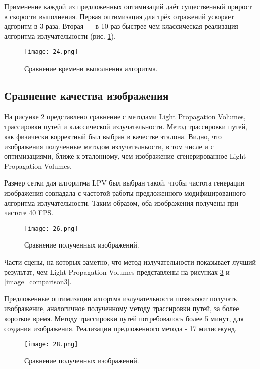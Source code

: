 \documentclass[12pt,fleqn]{article}
\begin{document}
Применение каждой из предложенных оптимизаций даёт существенный прирост в скорости выполнения. Первая оптимизация для трёх отражений ускоряет адгоритм в 3 раза. Вторая --- в 10 раз быстрее чем классическая реализация алгоритма излучательности (рис. \ref{speed_comparison}).

\begin{figure}[htb]
    \centering
    \texttt{[image: 24.png]}
    \caption{Сравнение времени выполнения алгоритма.}
    \label{speed_comparison}
\end{figure}


\subsection{Сравнение качества изображения}

На рисунке \ref{image_comparison} представлено сравнение с методами Light Propagation Volumes, трассировки путей и классической излучательности. Метод трассировки путей, как физически корректный был выбран в качестве эталона. Видно, что изображения полученные матодом излучателньости, в том числе и с оптимизациями, ближе к эталонному, чем изображение сгенерированное Light Propagation Volumes. 

Размер сетки для алгоритма LPV был выбран такой, чтобы частота генерации изображения совпадала с частотой работы предложенного модифицированного алгоритма излучательности. Таким образом, оба изображения получены при частоте 40 FPS.

\pagebreak

\begin{figure}[htb]
    \centering
    \texttt{[image: 26.png]}
    \caption{Сравнение полученных изображений.}
    \label{image_comparison}
\end{figure}

Части сцены, на которых заметно, что метод излучательности показывает лучший результат, чем Light Propagation Volumes представлены на рисунках \ref{image_comparison2} и \ref{image_comparison3}.

Предложенные оптимизации алгортма излучательности позволяют получать изображение, аналогичное полученному методу трассировки путей, за более короткое время. Методу трассировки путей потребовалось более 5 минут, для создания изображения. Реализации предложенного метода - 17 милисекунд.

\pagebreak

\begin{figure}[htb]
    \centering
    \texttt{[image: 28.png]}
    \caption{Сравнение полученных изображений.}
    \label{image_comparison2}
\end{figure}
\end{document}

